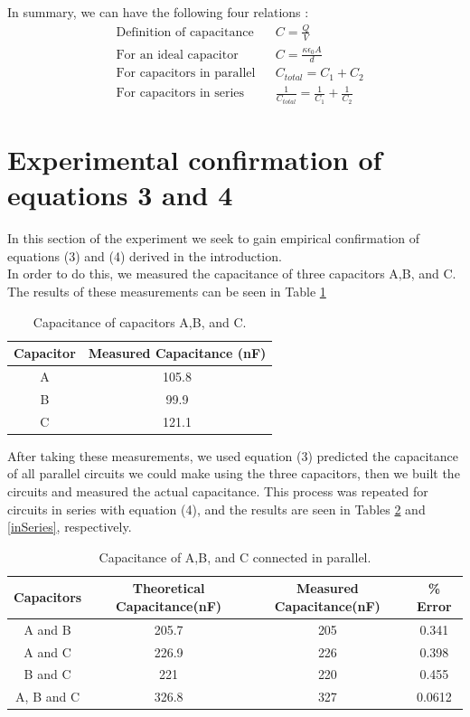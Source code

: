 \documentclass[oneside,12pt]{amsart}
\begin{document}
	\indent In summary, we can have the following four relations \cite{cap}\cite{parallel}:
	\begin{align}
	&\text{Definition of capacitance} &&	C = \frac{Q}{V}\\
	&\text{For an ideal capacitor} &&C = \frac{\kappa \epsilon _{0}A}{d}\\
	&\text{For capacitors in parallel} &&C_{total} = C_1 + C_2\\
	&\text{For capacitors in series} && \frac{1}{C_{total}} = \frac{1}{C_1}+\frac{1}{C_2}
	\end{align}
	
	\section{Experimental confirmation of equations 3 and 4}
	\indent In this section of the experiment we seek to gain empirical confirmation of equations (3) and (4) derived in the introduction.\\
	
	\indent In order to do this, we measured the capacitance of three capacitors A,B, and C. The results of these measurements can be seen in Table \ref{abc} 

	\begin{table}[H]
		\begin{tabular}{ |c|c|}
			\hline
			Capacitor & Measured Capacitance (nF)\\
			\hline
			A&105.8\\
			B&99.9\\
			C&121.1\\
			\hline
		\end{tabular}
		\caption{Capacitance of capacitors A,B, and C.}
		\label{abc}
	\end{table}

	\indent After taking these measurements, we used equation (3) predicted the capacitance of all parallel circuits we could make using the three capacitors, then we built the circuits and measured the actual capacitance. This process was repeated for circuits in series with equation (4), and the results are seen in Tables \ref{inParallel} and \ref{inSeries}, respectively. 
	\begin{table}[H]
		\begin{tabular}{ |c|c|c|c|}
			\hline
			Capacitors & Theoretical Capacitance(nF)& Measured Capacitance(nF) &\% Error\\
			\hline
			A and B	&205.7&205&0.341\\
			A and C&226.9 & 226&0.398\\
			B and C&221&220&0.455\\
			A, B and C&326.8&327&0.0612\\
			\hline
		\end{tabular}
		\caption{Capacitance of A,B, and C connected in parallel.}
		\label{inParallel}
	\end{table}
\end{document}
